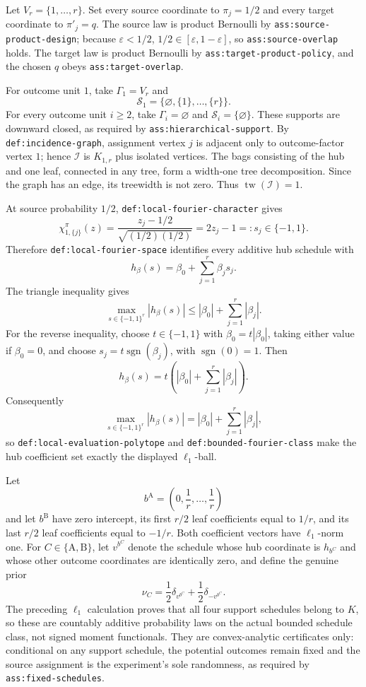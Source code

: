 Let \(V_r=\{1,\ldots,r\}\).  Set every source coordinate to \(\pi_j=1/2\) and every target coordinate to \(\pi'_j=q\).  The source law is product Bernoulli by \texttt{ass:source-product-design}; because \(\varepsilon<1/2\), \(1/2\in[\varepsilon,1-\varepsilon]\), so \texttt{ass:source-overlap} holds.  The target law is product Bernoulli by \texttt{ass:target-product-policy}, and the chosen \(q\) obeys \texttt{ass:target-overlap}.

For outcome unit \(1\), take \(\Gamma_1=V_r\) and
\[
 \mathcal S_1=\{\varnothing,\{1\},\ldots,\{r\}\}.
\]
For every outcome unit \(i\ge2\), take \(\Gamma_i=\varnothing\) and \(\mathcal S_i=\{\varnothing\}\).  These supports are downward closed, as required by \texttt{ass:hierarchical-support}.  By \texttt{def:incidence-graph}, assignment vertex \(j\) is adjacent only to outcome-factor vertex \(1\); hence \(\mathcal I\) is \(K_{1,r}\) plus isolated vertices.  The bags consisting of the hub and one leaf, connected in any tree, form a width-one tree decomposition.  Since the graph has an edge, its treewidth is not zero.  Thus \(\operatorname{tw}(\mathcal I)=1\).

At source probability \(1/2\), \texttt{def:local-fourier-character} gives
\[
 \chi_{1,\{j\}}^\pi(z)=\frac{z_j-1/2}{\sqrt{(1/2)(1/2)}}=2z_j-1=:s_j\in\{-1,1\}.
\]
Therefore \texttt{def:local-fourier-space} identifies every additive hub schedule with
\[
 h_\beta(s)=\beta_0+\sum_{j=1}^r\beta_js_j.
\]
The triangle inequality gives
\[
 \max_{s\in\{-1,1\}^r}|h_\beta(s)|
 \le |\beta_0|+\sum_{j=1}^r|\beta_j|.
\]
For the reverse inequality, choose \(t\in\{-1,1\}\) with \(\beta_0=t|\beta_0|\), taking either value if \(\beta_0=0\), and choose \(s_j=t\operatorname{sgn}(\beta_j)\), with \(\operatorname{sgn}(0)=1\).  Then
\[
 h_\beta(s)=t\left(|\beta_0|+\sum_{j=1}^r|\beta_j|\right).
\]
Consequently
\[
 \max_{s\in\{-1,1\}^r}|h_\beta(s)|
 =|\beta_0|+\sum_{j=1}^r|\beta_j|,
\]
so \texttt{def:local-evaluation-polytope} and \texttt{def:bounded-fourier-class} make the hub coefficient set exactly the displayed \(\ell_1\)-ball.

Let
\[
 b^{\mathrm A}=\left(0,\frac1r,\ldots,\frac1r\right)
\]
and let \(b^{\mathrm B}\) have zero intercept, its first \(r/2\) leaf coefficients equal to \(1/r\), and its last \(r/2\) leaf coefficients equal to \(-1/r\).  Both coefficient vectors have \(\ell_1\)-norm one.  For \(C\in\{\mathrm A,\mathrm B\}\), let \(v^{b^C}\) denote the schedule whose hub coordinate is \(h_{b^C}\) and whose other outcome coordinates are identically zero, and define the genuine prior
\[
 \nu_C=\frac12\delta_{v^{b^C}}+\frac12\delta_{-v^{b^C}}.
\]
The preceding \(\ell_1\) calculation proves that all four support schedules belong to \(K\), so these are countably additive probability laws on the actual bounded schedule class, not signed moment functionals.  They are convex-analytic certificates only: conditional on any support schedule, the potential outcomes remain fixed and the source assignment is the experiment's sole randomness, as required by \texttt{ass:fixed-schedules}.

